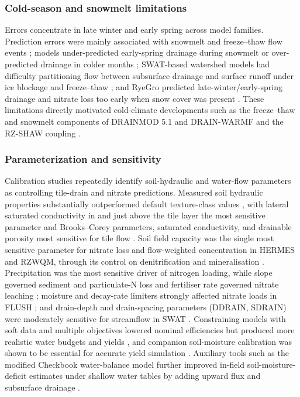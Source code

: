 \subsubsection{Cold-season and snowmelt limitations}

Errors concentrate in late winter and early spring across model families. Prediction errors were mainly associated with snowmelt and freeze--thaw flow events \parencite{Luo2010}; models under-predicted early-spring drainage during snowmelt or over-predicted drainage in colder months \parencite{Nangia2008,Yang2007}; SWAT-based watershed models had difficulty partitioning flow between subsurface drainage and surface runoff under ice blockage and freeze--thaw \parencite{Nangia2010}; and RyeGro predicted late-winter/early-spring drainage and nitrate loss too early when snow cover was present \parencite{Feyereisen2007}. These limitations directly motivated cold-climate developments such as the freeze--thaw and snowmelt components of DRAINMOD 5.1 and DRAIN-WARMF and the RZ-SHAW coupling \parencite{Wang2006c,Dayyani2010b,Dayyani2010,Li2024b}.

\subsubsection{Parameterization and sensitivity}

Calibration studies repeatedly identify soil-hydraulic and water-flow parameters as controlling tile-drain and nitrate predictions. Measured soil hydraulic properties substantially outperformed default texture-class values \parencite{Ma2007c,Ahuja2007}, with lateral saturated conductivity in and just above the tile layer the most sensitive parameter \parencite{Ma2007c} and Brooks--Corey parameters, saturated conductivity, and drainable porosity most sensitive for tile flow \parencite{Ahmed2007}. Soil field capacity was the single most sensitive parameter for nitrate loss and flow-weighted concentration in HERMES and RZWQM, through its control on denitrification and mineralisation \parencite{Malone2017,Gillette2018}. Precipitation was the most sensitive driver of nitrogen loading, while slope governed sediment and particulate-N loss and fertiliser rate governed nitrate leaching \parencite{Deng2011}; moisture and decay-rate limiters strongly affected nitrate loads in FLUSH \parencite{Salo2015}; and drain-depth and drain-spacing parameters (DDRAIN, SDRAIN) were moderately sensitive for streamflow in SWAT \parencite{Moriasi2012}. Constraining models with soft data and multiple objectives lowered nominal efficiencies but produced more realistic water budgets and yields \parencite{Nelson2018}, and companion soil-moisture calibration was shown to be essential for accurate yield simulation \parencite{Wang2016}. Auxiliary tools such as the modified Checkbook water-balance model further improved in-field soil-moisture-deficit estimates under shallow water tables by adding upward flux and subsurface drainage \parencite{Kolars2019}.

